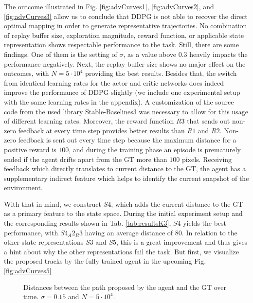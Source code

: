 The outcome illustrated in Fig. \ref{fig:advCurves1}, \ref{fig:advCurves2}, and \ref{fig:advCurves3} allow us to conclude that DDPG is not able to recover the direct optimal mapping in order to generate representative trajectories. No combination of replay buffer size, exploration magnitude, reward function, or applicable state representation shows respectable performance to the task. Still, there are some findings. One of them is the setting of $\sigma$, as a value above $0.3$ heavily impacts the performance negatively. Next, the replay buffer size shows no major effect on the outcomes, with $N=5 \cdot 10^4$ providing the best results. Besides that, the switch from identical learning rates for the actor and critic networks does indeed improve the performance of DDPG slightly (we include one experimental setup with the same learning rates in the appendix). A customization of the source code from the used library Stable-Baselines3 was necessary to allow for this usage of different learning rates. Moreover, the reward function $R3$ that sends out non-zero feedback at every time step provides better results than $R1$ and $R2$. Non-zero feedback is sent out every time step because the maximum distance for a positive reward is $100$, and during the training phase an episode is prematurely ended if the agent drifts apart from the GT more than $100$ pixels. Receiving feedback which directly translates to current distance to the GT, the agent has a supplementary indirect feature which helps to identify the current snapshot of the environment.
\par
With that in mind, we construct $S4$, which adds the current distance to the GT as a primary feature to the state space. During the initial experiment setup and the corresponding results shown in Tab. \ref{tab:resultsK3}, $S4$ yields the best performance, with $S4_A2_R3$ having an average distance of $80$. In relation to the other state representations $S3$ and $S5$, this is a great improvement and thus gives a hint about why the other representations fail the task. But first, we visualize the proposed tracks by the fully trained agent in the upcoming Fig. \ref{fig:advCurves5}

\begin{figure}[H]
     \centering
         
        \caption{Distances between the path proposed by the agent and the GT over time. $\sigma = 0.15$ and $N=5\cdot 10^4$.}
        \label{fig:advCurves4}
\end{figure}


